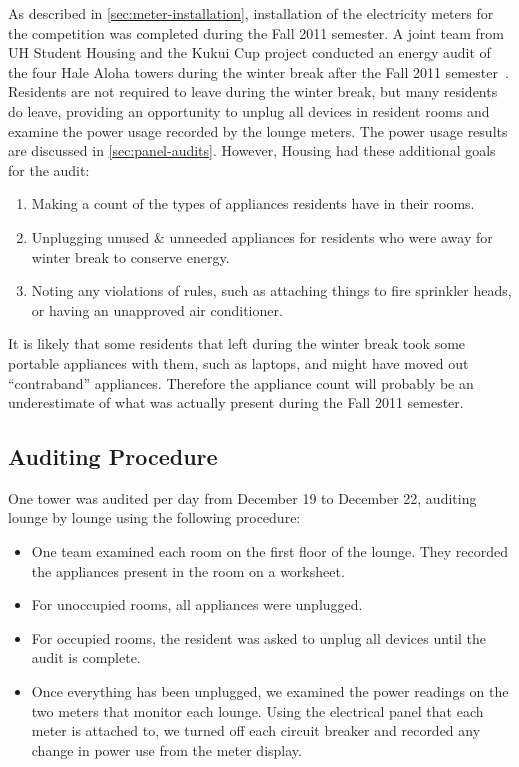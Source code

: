 As described in \autoref{sec:meter-installation}, installation of the electricity meters for the competition was completed during the Fall 2011 semester. A joint team from UH \Manoa Student Housing and the Kukui Cup project conducted an energy audit of the four Hale Aloha towers during the winter break after the Fall 2011 semester~\cite{csdl2-11-12}. Residents are not required to leave during the winter break, but many residents do leave, providing an opportunity to unplug all devices in resident rooms and examine the power usage recorded by the lounge meters. The power usage results are discussed in \autoref{sec:panel-audits}. However, Housing had these additional goals for the audit:

\begin{enumerate}
\item Making a count of the types of appliances residents have in their rooms.
\item Unplugging unused \& unneeded appliances for residents who were away for winter break to conserve energy.
\item Noting any violations of rules, such as attaching things to fire sprinkler heads, or having an unapproved air conditioner.
\end{enumerate}

It is likely that some residents that left during the winter break took some portable appliances with them, such as laptops, and might have moved out ``contraband'' appliances. Therefore the appliance count will probably be an underestimate of what was actually present during the Fall 2011 semester.


\subsection{Auditing Procedure}

One tower was audited per day from December 19 to December 22, auditing lounge by lounge using the following procedure:

\begin{itemize}
	\item One team examined each room on the first floor of the lounge. They recorded the appliances present in the room on a worksheet.
	\item For unoccupied rooms, all appliances were unplugged.
	\item For occupied rooms, the resident was asked to unplug all devices until the audit is complete.
	\item Once everything has been unplugged, we examined the power readings on the two meters that monitor each lounge. Using the electrical panel that each meter is attached to, we turned off each circuit breaker and recorded any change in power use from the meter display.
\end{itemize}


